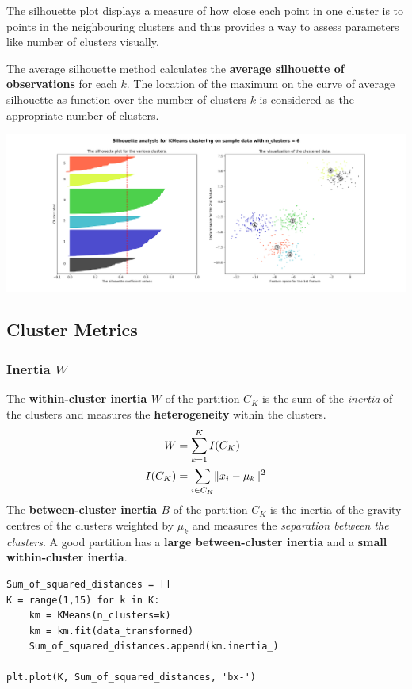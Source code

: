 \documentclass[11pt]{article}
\theoremstyle{definition}
\DeclarePairedDelimiter\norm{\lVert}{\rVert}
\begin{document}
The silhouette plot displays a measure of how close each point in one cluster is to points in the neighbouring clusters and thus provides a way to assess parameters like number of clusters visually.

The average silhouette method calculates the \textbf{average silhouette of observations} for each $k$. The location of the maximum on the curve of average silhouette as function over the number of clusters $k$ is considered as the appropriate number of clusters.

\begin{center}
	\includegraphics[width=0.9\linewidth]{img/silhouette_plot}
\end{center}

\subsection{Cluster Metrics}

\subsubsection{Inertia $W$}
The \textbf{within-cluster inertia $W$} of the partition $C_K$ is the sum of the \emph{inertia} of the clusters and measures the \textbf{heterogeneity} within the clusters.
\begin{align*}
	W &= \sum_{k=1}^{K} I(C_K)\\
	I(C_K) &= \sum_{i\in C_K} \norm{x_i - \mu_k}^2
\end{align*}
The \textbf{between-cluster inertia $B$} of the partition $C_K$ is the inertia of the gravity centres of the clusters weighted by $\mu_k$ and measures the \emph{separation between the clusters}. A good partition has a \textbf{large between-cluster inertia} and a \textbf{small within-cluster inertia}.

\begin{verbatim}
Sum_of_squared_distances = []
K = range(1,15) for k in K:
	km = KMeans(n_clusters=k)
	km = km.fit(data_transformed)
	Sum_of_squared_distances.append(km.inertia_)

plt.plot(K, Sum_of_squared_distances, 'bx-')
\end{verbatim}
\end{document}
